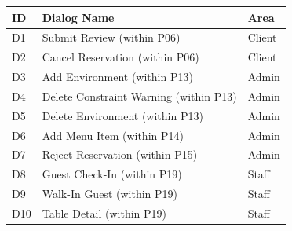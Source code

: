 \documentclass[12pt,a4paper]{article}
\begin{document}
\hfill
\begin{minipage}[t]{0.37\linewidth}
{\footnotesize
\begin{tabular}{@{}l l l@{}}
    \toprule
    \textbf{ID} & \textbf{Dialog Name} & \textbf{Area} \\
    \midrule
    D1  & Submit Review (within P06)             & Client \\
    D2  & Cancel Reservation (within P06)        & Client \\
    D3  & Add Environment (within P13)           & Admin \\
    D4  & Delete Constraint Warning (within P13) & Admin \\
    D5  & Delete Environment (within P13)        & Admin \\
    D6  & Add Menu Item (within P14)             & Admin \\
    D7  & Reject Reservation (within P15)        & Admin \\
    D8  & Guest Check-In (within P19)            & Staff \\
    D9  & Walk-In Guest (within P19)             & Staff \\
    D10 & Table Detail (within P19)              & Staff \\
    \bottomrule
\end{tabular}
}
\end{minipage}
\end{document}

